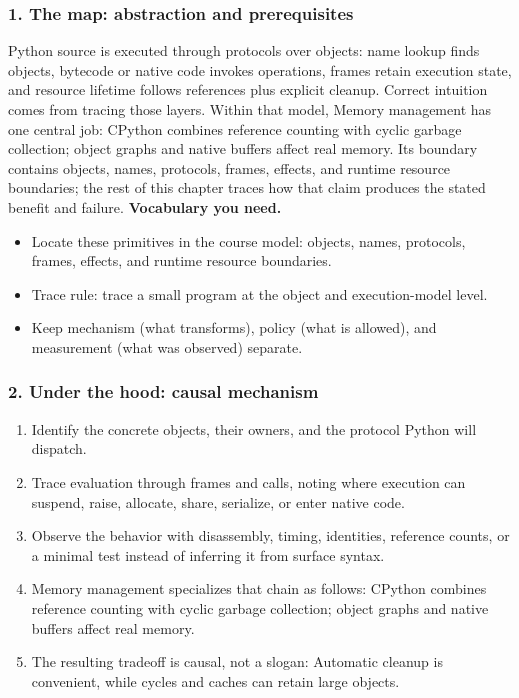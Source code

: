 \subsubsection*{1. The map: abstraction and prerequisites}
Python source is executed through protocols over objects: name lookup finds objects, bytecode or native code invokes operations, frames retain execution state, and resource lifetime follows references plus explicit cleanup. Correct intuition comes from tracing those layers.
Within that model, Memory management has one central job: CPython combines reference counting with cyclic garbage collection; object graphs and native buffers affect real memory. Its boundary contains objects, names, protocols, frames, effects, and runtime resource boundaries; the rest of this chapter traces how that claim produces the stated benefit and failure.
\textbf{Vocabulary you need.}\begin{itemize}
\item Locate these primitives in the course model: objects, names, protocols, frames, effects, and runtime resource boundaries.
\item Trace rule: trace a small program at the object and execution-model level.
\item Keep mechanism (what transforms), policy (what is allowed), and measurement (what was observed) separate.
\end{itemize}
\subsubsection*{2. Under the hood: causal mechanism}\begin{enumerate}
\item Identify the concrete objects, their owners, and the protocol Python will dispatch.
\item Trace evaluation through frames and calls, noting where execution can suspend, raise, allocate, share, serialize, or enter native code.
\item Observe the behavior with disassembly, timing, identities, reference counts, or a minimal test instead of inferring it from surface syntax.
\item Memory management specializes that chain as follows: CPython combines reference counting with cyclic garbage collection; object graphs and native buffers affect real memory.
\item The resulting tradeoff is causal, not a slogan: Automatic cleanup is convenient, while cycles and caches can retain large objects.
\end{enumerate}
